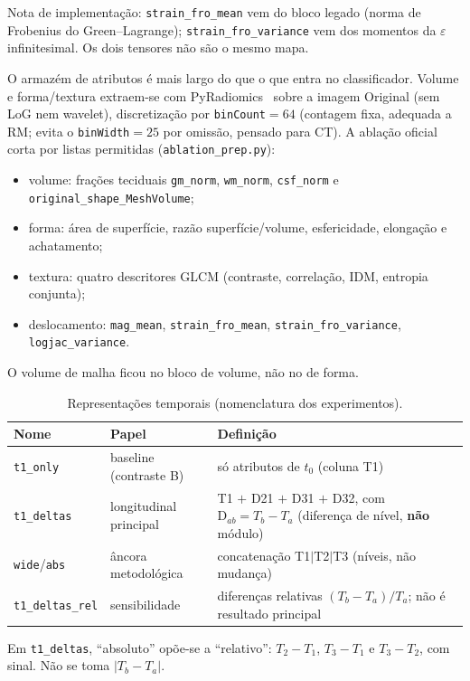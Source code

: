 \documentclass[review]{elsarticle}
\newcommand{\code}[1]{\texttt{#1}}
\begin{document}
	Nota de implementação: \code{strain\_fro\_mean} vem do bloco legado (norma de Frobenius do Green--Lagrange); \code{strain\_fro\_variance} vem dos momentos da $\varepsilon$ infinitesimal. Os dois tensores não são o mesmo mapa.
	
	O armazém de atributos é mais largo do que o que entra no classificador.
	Volume e forma/textura extraem-se com PyRadiomics~\cite{griethuysen-2017,zwanenburg-2020} sobre a imagem Original (sem LoG nem wavelet), discretização por \code{binCount}$=64$ (contagem fixa, adequada a RM; evita o \code{binWidth}$=25$ por omissão, pensado para CT).
	A ablação oficial corta por listas permitidas (\code{ablation\_prep.py}):
	\begin{itemize}
		\item volume: frações teciduais \code{gm\_norm}, \code{wm\_norm}, \code{csf\_norm} e \code{original\_shape\_MeshVolume};
		\item forma: área de superfície, razão superfície/volume, esfericidade, elongação e achatamento;
		\item textura: quatro descritores GLCM (contraste, correlação, IDM, entropia conjunta);
		\item deslocamento: \code{mag\_mean}, \code{strain\_fro\_mean}, \code{strain\_fro\_variance}, \code{logjac\_variance}.
	\end{itemize}
	O volume de malha ficou no bloco de volume, não no de forma.
	
	\begin{table}[htbp]
		\centering
		\caption{Representações temporais (nomenclatura dos experimentos).}
		\label{tab:reps}
		\begin{tabular}{llp{7.2cm}}
			\toprule
			Nome & Papel & Definição \\
			\midrule
			\code{t1\_only}    & baseline (contraste B) & só atributos de $t_0$ (coluna T1) \\
			\code{t1\_deltas}  & longitudinal principal & T1 $+$ D21 $+$ D31 $+$ D32, com $\mathrm{D}_{ab}=T_b-T_a$ (diferença de nível, \textbf{não} módulo) \\
			\code{wide}/\code{abs} & âncora metodológica & concatenação T1$|$T2$|$T3 (níveis, não mudança) \\
			\code{t1\_deltas\_rel} & sensibilidade & diferenças relativas $(T_b-T_a)/T_a$; não é resultado principal \\
			\bottomrule
		\end{tabular}
	\end{table}
	
	Em \code{t1\_deltas}, ``absoluto'' opõe-se a ``relativo'': $T_2-T_1$, $T_3-T_1$ e $T_3-T_2$, com sinal.
	Não se toma $|T_b-T_a|$.
	
\end{document}
